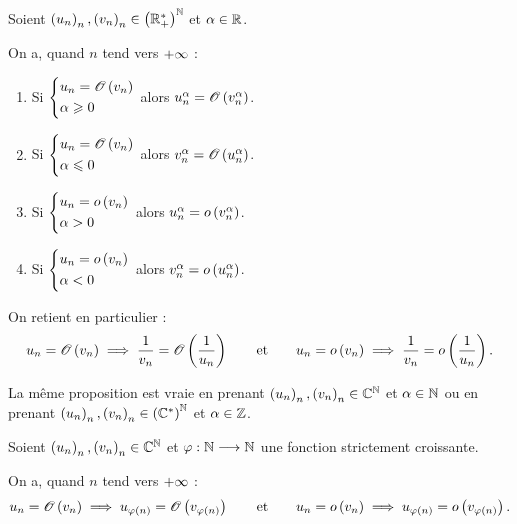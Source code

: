 \begin{prop}[Puissances]
Soient \(\left(u_n\right)_n,\left(v_n\right)_n\in\left(\mathbb{R}_+^*\right)^{\mathbb{N}}\) et \(\alpha\in\mathbb{R}\).

On a, quand \(n\) tend vers \(+\infty\) :

\begin{enumerate}
    \item Si \(\begin{dcases}
        u_n=\mathscr{O}\left(v_n\right) \\
        \alpha\geqslant0
    \end{dcases}\) alors \(u_n^\alpha=\mathscr{O}\left(v_n^\alpha\right)\). \\
    \item Si \(\begin{dcases}
        u_n=\mathscr{O}\left(v_n\right) \\
        \alpha\leqslant0
    \end{dcases}\) alors \(v_n^\alpha=\mathscr{O}\left(u_n^\alpha\right)\). \\
    \item Si \(\begin{dcases}
        u_n=o\left(v_n\right) \\
        \alpha>0
    \end{dcases}\) alors \(u_n^\alpha=o\left(v_n^\alpha\right)\). \\
    \item Si \(\begin{dcases}
        u_n=o\left(v_n\right) \\
        \alpha<0
    \end{dcases}\) alors \(v_n^\alpha=o\left(u_n^\alpha\right)\).
\end{enumerate}

On retient en particulier : \[u_n=\mathscr{O}\left(v_n\right)\implies\dfrac{1}{v_n}=\mathscr{O}\left(\dfrac{1}{u_n}\right)\qquad\text{et}\qquad u_n=o\left(v_n\right)\implies\dfrac{1}{v_n}=o\left(\dfrac{1}{u_n}\right).\]

La même proposition est vraie en prenant \(\left(u_n\right)_n,\left(v_n\right)_n\in\mathbb{C}^{\mathbb{N}}\) et \(\alpha\in\mathbb{N}\) ou en prenant \(\left(u_n\right)_n,\left(v_n\right)_n\in\left(\mathbb{C}^*\right)^{\mathbb{N}}\) et \(\alpha\in\mathbb{Z}\).
\end{prop}

\begin{prop}
Soient \(\left(u_n\right)_n,\left(v_n\right)_n\in\mathbb{C}^{\mathbb{N}}\) et \(\varphi:\mathbb{N}\longrightarrow\mathbb{N}\) une fonction strictement croissante.

On a, quand \(n\) tend vers \(+\infty\) : \[u_n=\mathscr{O}\left(v_n\right)\implies u_{\varphi\left(n\right)}=\mathscr{O}\left(v_{\varphi\left(n\right)}\right)\qquad\text{et}\qquad u_n=o\left(v_n\right)\implies u_{\varphi\left(n\right)}=o\left(v_{\varphi\left(n\right)}\right).\]
\end{prop}

